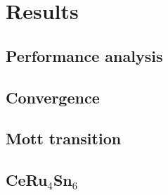 
\chapter{Results}

\section{Performance analysis}

\section{Convergence}

\section{Mott transition}

\section{\texorpdfstring{CeRu$_4$Sn$_6$}{CeRu4Sn6}}
